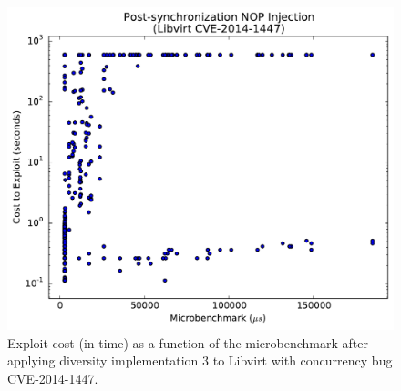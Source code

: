 \begin{figure}
	\centering
	\includegraphics[width=\columnwidth]{figures/libvirt-post}
\caption{Exploit cost (in time) as a function of the microbenchmark after applying diversity implementation 3 to Libvirt with concurrency bug CVE-2014-1447.}
	\label{fig_libvirt-post}
\end{figure}